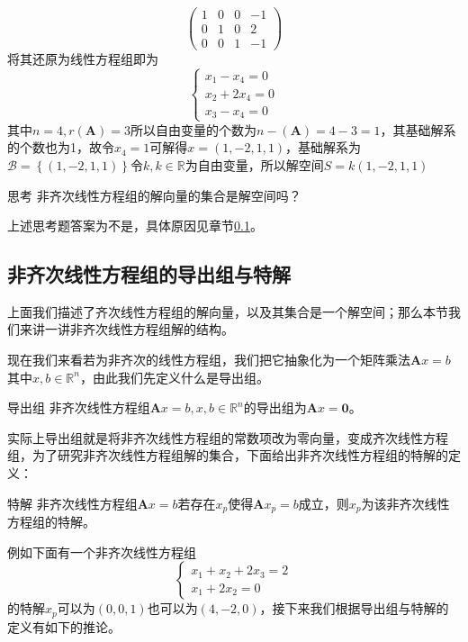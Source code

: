 \begin{example}
$$\begin{pmatrix}
		1 & 0 & 0 & -1\\
		0 & 1 & 0 & 2\\
		0 & 0 & 1 & -1
	   \end{pmatrix}$$将其还原为线性方程组即为$$\left\{\begin{matrix} 
		x_1-x_4=0 \\  
		x_2+2x_4=0 \\
		x_3-x_4=0
	  \end{matrix}\right. $$其中$n=4,r(\mathbf{A})=3$所以自由变量的个数为$n-(\mathbf{A})=4-3=1$，其基础解系的个数也为1，故令$x_4=1$可解得$x=(1,-2,1,1)$，基础解系为$\mathcal{B}=\left\{ (1,-2,1,1) \right\}$令$k,k\in \mathbb{R}$为自由变量，所以解空间$S=k(1,-2,1,1)$
\end{example}

\begin{ascolorbox1}{思考}
	非齐次线性方程组的解向量的集合是解空间吗？
\end{ascolorbox1}

上述思考题答案为不是，具体原因见章节\ref{subsec:ascanswer}。

\subsection{非齐次线性方程组的导出组与特解}

\label{subsec:ascanswer}

上面我们描述了齐次线性方程组的解向量，以及其集合是一个解空间；那么本节我们来讲一讲非齐次线性方程组解的结构。

现在我们来看若为非齐次的线性方程组，我们把它抽象化为一个矩阵乘法$\mathbf{A}x=b$其中$x,b\in \mathbb{R}^n$，由此我们先定义什么是导出组。

\begin{definition}{导出组}
	非齐次线性方程组$\mathbf{A}x=b,x,b\in \mathbb{R}^n$的导出组为$\mathbf{A}x=\boldsymbol{0}$。
\end{definition}

实际上导出组就是将非齐次线性方程组的常数项改为零向量，变成齐次线性方程组，为了研究非齐次线性方程组解的集合，下面给出非齐次线性方程组的特解的定义：

\begin{definition}{特解}
	非齐次线性方程组$\mathbf{A}x=b$若存在$x_p$使得$\mathbf{A}x_p=b$成立，则$x_p$为该非齐次线性方程组的特解。
\end{definition}

例如下面有一个非齐次线性方程组$$\left\{\begin{matrix} 
	x_1+x_2+2x_3=2 \\  
	x_1+2x_2 = 0
\end{matrix}\right. $$的特解$x_p$可以为$(0,0,1)$也可以为$(4,-2,0)$，接下来我们根据导出组与特解的定义有如下的推论。

